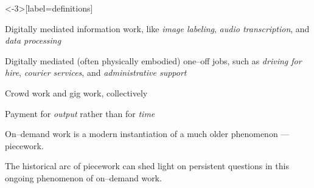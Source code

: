 \documentclass[presentation]{subfiles}
\begin{document}
\begin{frame}<-3>[label=definitions]{}
  \begin{description}
    \item<1-> [Crowd work] Digitally mediated \alert{information work}, like 
      \emph{image labeling}, \emph{audio transcription}, and \emph{data processing}\par
      \scriptsize{\textcite{crowdworkFuture}\par}\normalsize{}
    \item<2-> [Gig work] Digitally mediated (often \alert{physically embodied}) one--off jobs,
      such as
      \emph{driving for hire},
      \emph{courier services},
      and \emph{administrative support}\par
      \scriptsize{\textcite{friedman2014workers,Parigi:2016:GE:3026779.3013496}\par}\normalsize{}
    \item<3-> [On--demand work] Crowd work and gig work, collectively
  \end{description}
  \begin{description}
    \item<5-> [{Piecework}] {Payment for \emph{output} rather than for \emph{time}}
  \end{description}
\end{frame}


\begin{frame}[standout,label=takeaway]{}
  On--demand work is a modern instantiation of a much older phenomenon
  --- \alert{piecework}.

  {\normalsize The historical arc of piecework
  can shed light on persistent questions
  in this ongoing phenomenon of on--demand work.}
\end{frame}

\end{document}
